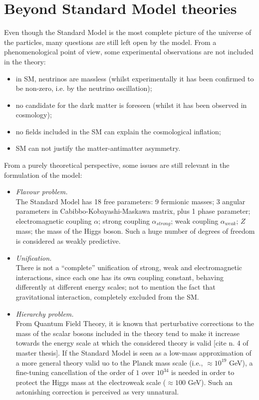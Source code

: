 \section{Beyond Standard Model theories}
Even though the Standard Model is the most complete picture of the universe of the particles, many questions are still left open by the model. From a phenomenological point of view, some experimental observations are not included in the theory:
\begin{itemize}
\item in SM, neutrinos are massless (whilst experimentally it has been confirmed to be non-zero, i.e. by the neutrino oscillation);
\item no candidate for the dark matter is foreseen (whilst it has been observed in cosmology);
\item no fields included in the SM can explain the cosmological inflation;
\item SM can not justify the matter-antimatter asymmetry.
\end{itemize}
From a purely theoretical perspective, some issues are still relevant in the formulation of the model:
\begin{itemize}
\item {\itshape Flavour problem.}\\ The Standard Model has 18 free parameters: 9 fermionic masses; 3 angular parameters in Cabibbo-Kobayashi-Maskawa matrix, plus 1 phase parameter; electromagnetic coupling $\alpha$; strong coupling $\alpha_{strong}$;  weak coupling $\alpha_{weak}$; $Z$ mass; the mass of the Higgs boson. Such a huge number of degrees of freedom is considered as weakly predictive.
\item {\itshape Unification.}\\ There is not a ``complete'' unification of strong, weak and electromagnetic interactions, since each one has its own coupling constant, behaving differently at different energy scales; not to mention the fact that gravitational interaction, completely excluded from the SM.
\item {\itshape Hierarchy problem.}\\ From Quantum Field Theory, it is known that perturbative corrections to the mass of the scalar bosons included in the theory tend to make it increase towards the energy scale at which the considered theory is valid [cite n. 4 of master thesis]. If the Standard Model is seen as a low-mass approximation of a more general theory valid uo to the Planck mass scale (i.e., $\approx 10^{19}$ GeV), a fine-tuning cancellation of the order of $1$ over $10^{34}$ is needed in order to protect the Higgs mass at the electroweak scale ($\approx 100$ GeV). Such an astonishing correction is perceived as very unnatural.
\end{itemize}

